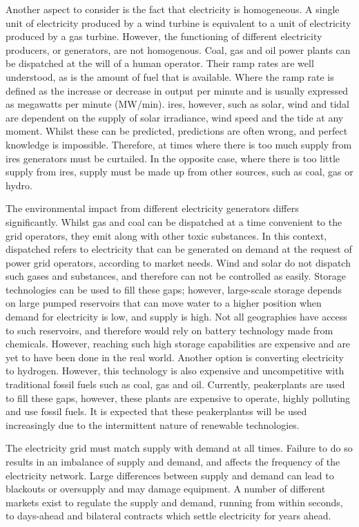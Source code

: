 Another aspect to consider is the fact that electricity is homogeneous. A single unit of electricity produced by a wind turbine is equivalent to a unit of electricity produced by a gas turbine. However, the functioning of different electricity producers, or generators, are not homogenous. Coal, gas and oil power plants can be \gls{dispatched} at the will of a human operator. Their ramp rates are well understood, as is the amount of fuel that is available. Where the ramp rate is defined as the increase or decrease in output per minute and is usually expressed as megawatts per minute (MW/min). \acrfull{ires}, however, such as solar, wind and tidal are dependent on the supply of solar irradiance, wind speed and the tide at any moment. Whilst these can be predicted, predictions are often wrong, and perfect knowledge is impossible. Therefore, at times where there is too much supply from \Gls{ires} generators must be curtailed. In the opposite case, where there is too little supply from \acrshort{ires}, supply must be made up from other sources, such as coal, gas or hydro.

The environmental impact from different electricity generators differs significantly. Whilst gas and coal can be dispatched at a time convenient to the grid operators, they emit  along with other toxic substances. In this context, dispatched refers to electricity that can be generated on demand at the request of power grid operators, according to market needs. Wind and solar do not dispatch such gases and substances, and therefore can not be controlled as easily. Storage technologies can be used to fill these gaps; however, large-scale storage depends on large pumped reservoirs that can move water to a higher position when demand for electricity is low, and supply is high. Not all geographies have access to such reservoirs, and therefore would rely on battery technology made from chemicals. However, reaching such high storage capabilities are expensive and are yet to have been done in the real world. Another option is converting electricity to hydrogen. However, this technology is also expensive and uncompetitive with traditional fossil fuels such as coal, gas and oil. Currently, \gls{peakerplants} are used to fill these gaps, however, these plants are expensive to operate, highly polluting and use fossil fuels. It is expected that these \gls{peakerplants}s will be used increasingly due to the intermittent nature of renewable technologies. 


The electricity grid must match supply with demand at all times. Failure to do so results in an imbalance of supply and demand, and affects the frequency of the electricity network. Large differences between supply and demand can lead to blackouts or oversupply and may damage equipment. A number of different markets exist to regulate the supply and demand, running from within seconds, to days-ahead and bilateral contracts which settle electricity for years ahead.

